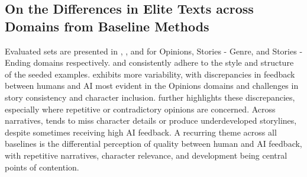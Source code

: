 \subsection{On the Differences in Elite Texts across Domains from Baseline Methods}\label{app:qualitative_summary_baseline}

Evaluated sets are presented in , , and  for Opinions, Stories - Genre, and Stories - Ending domains respectively. \baseone{} and \basetwo{} consistently adhere to the style and structure of the seeded examples. \basethree{} exhibits more variability, with discrepancies in feedback between humans and AI most evident in the Opinions domains and challenges in story consistency and character inclusion. \basefour{} further highlights these discrepancies, especially where repetitive or contradictory opinions are concerned. Across narratives, \basefour{} tends to miss character details or produce underdeveloped storylines, despite sometimes receiving high AI feedback. A recurring theme across all baselines is the differential perception of quality between human and AI feedback, with repetitive narratives, character relevance, and development being central points of contention.

